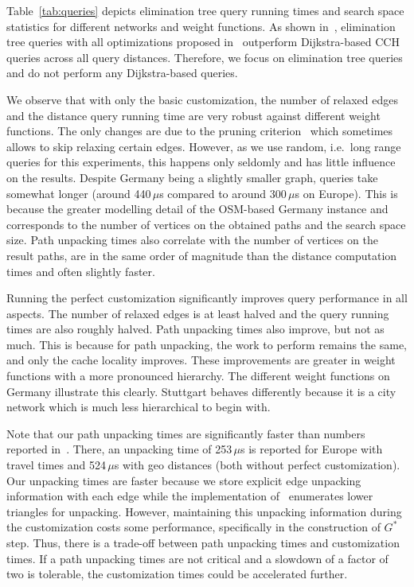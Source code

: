 \documentclass[a4paper, english, cleveref]{lipics-v2021}
\begin{document}
Table~\ref{tab:queries} depicts elimination tree query running times and search space statistics for different networks and weight functions.
As shown in~\cite{BuchholdSW19}, elimination tree queries with all optimizations proposed in~\cite{BuchholdSW19} outperform Dijkstra-based CCH queries across all query distances.
Therefore, we focus on elimination tree queries and do not perform any Dijkstra-based queries.

We observe that with only the basic customization, the number of relaxed edges and the distance query running time are very robust against different weight functions.
The only changes are due to the pruning criterion~\cite{BuchholdSW19} which sometimes allows to skip relaxing certain edges.
However, as we use random, i.e.\  long range queries for this experiments, this happens only seldomly and has little influence on the results.
Despite Germany being a slightly smaller graph, queries take somewhat longer (around 440\,$\mu$s compared to around 300\,$\mu$s on Europe).
This is because the greater modelling detail of the OSM-based Germany instance and corresponds to the number of vertices on the obtained paths and the search space size.
Path unpacking times also correlate with the number of vertices on the result paths, are in the same order of magnitude than the distance computation times and often slightly faster.

Running the perfect customization significantly improves query performance in all aspects.
The number of relaxed edges is at least halved and the query running times are also roughly halved.
Path unpacking times also improve, but not as much.
This is because for path unpacking, the work to perform remains the same, and only the cache locality improves.
These improvements are greater in weight functions with a more pronounced hierarchy.
The different weight functions on Germany illustrate this clearly.
Stuttgart behaves differently because it is a city network which is much less hierarchical to begin with.

Note that our path unpacking times are significantly faster than numbers reported in~\cite{DibbeltSW16}.
There, an unpacking time of 253\,$\mu$s is reported for Europe with travel times and 524\,$\mu$s with geo distances (both without perfect customization).
Our unpacking times are faster because we store explicit edge unpacking information with each edge while the implementation of~\cite{DibbeltSW16} enumerates lower triangles for unpacking.
However, maintaining this unpacking information during the customization costs some performance, specifically in the construction of $G^*$ step.
Thus, there is a trade-off between path unpacking times and customization times.
If a path unpacking times are not critical and a slowdown of a factor of two is tolerable, the customization times could be accelerated further.
\end{document}
